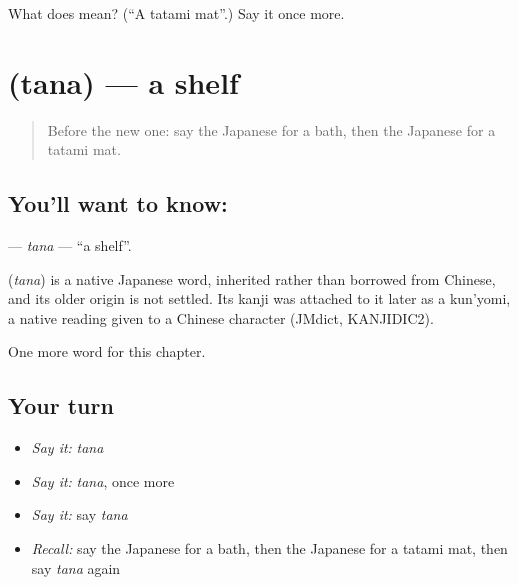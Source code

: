 \begin{tcolorbox}[breakable,colback=teal!4,colframe=teal!35!black,title={Before you move on}]
What does  mean? (\textquotedblleft{}A tatami mat\textquotedblright{}.) Say it once more.
\end{tcolorbox}
\section[\texorpdfstring{\ja{たな} (tana)}{たな (tana)}]{ (tana) — a shelf}

\label{lesson:JA-C39-tana}



\begin{quote}
Before the new one: say the Japanese for a bath, then the Japanese for a tatami mat.
\end{quote}

\subsection*{You'll want to know: }
\textbf{} — \emph{tana} — \textquotedblleft{}a shelf\textquotedblright{}.

\begin{cousinweb}
\textbf{} (\emph{tana}) is a native Japanese word, inherited rather than borrowed from Chinese, and its older origin is not settled. Its kanji was attached to it later as a kun'yomi, a native reading given to a Chinese character (JMdict, KANJIDIC2).
\end{cousinweb}

\begin{grammarlens}[title={What you've built}]
One more word for this chapter.
\end{grammarlens}

\subsection*{Your turn}
\begin{itemize}
\raggedright
  \item \emph{Say it:} \emph{tana}
  \item \emph{Say it:} \emph{tana}, once more
  \item \emph{Say it:} say \emph{tana}
  \item \emph{Recall:} say the Japanese for a bath, then the Japanese for a tatami mat, then say \emph{tana} again
\end{itemize}

